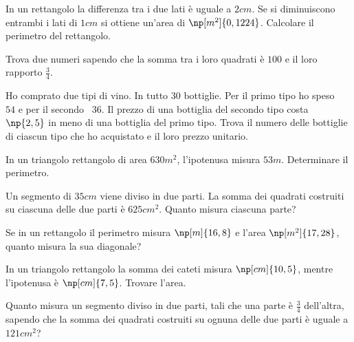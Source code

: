 \begin{multicols}{2}
\begin{esercizio}[\Ast]
 \label{ese:6.56}
In un rettangolo la differenza tra i due lati è uguale a $2\unit{cm}$. Se si diminuiscono entrambi i lati di $ 1\unit{cm} $ si ottiene un'area di $\np[m^2]{0,1224}$. Calcolare il perimetro del rettangolo.
\end{esercizio}

\begin{esercizio}[\Ast]
 \label{ese:6.57}
Trova due numeri sapendo che la somma tra i loro quadrati è $ 100 $ e il loro rapporto $ \frac 3 4 $.
\end{esercizio}

\begin{esercizio}[\Ast]
 \label{ese:6.58}
Ho comprato due tipi di vino. In tutto 30 bottiglie. Per il primo tipo ho speso \officialeuro~$54$ e per il secondo \officialeuro~$36$. Il prezzo di una bottiglia del secondo tipo costa \officialeuro~$\np{2,5}$ in meno di una bottiglia del primo tipo. Trova il numero delle bottiglie di ciascun tipo che ho acquistato e il loro prezzo unitario.
\end{esercizio}

\begin{esercizio}[\Ast]
 \label{ese:6.59}
In un triangolo rettangolo di area $630\unit{m^2}$, l'ipotenusa misura $53\unit{m}$. Determinare il perimetro.
\end{esercizio}

\begin{esercizio}[\Ast]
 \label{ese:6.60}
Un segmento di $35\unit{cm}$ viene diviso in due parti. La somma dei quadrati costruiti su ciascuna delle due parti è $625\unit{{cm}^2}$. Quanto misura ciascuna parte?
\end{esercizio}

\begin{esercizio}[\Ast]
 \label{ese:6.61}
Se in un rettangolo il perimetro misura $\np[m]{16,8}$ e l'area $ \np[m^2]{17,28}$, quanto misura la sua diagonale?
\end{esercizio}

\begin{esercizio}[\Ast]
 \label{ese:6.62}
In un triangolo rettangolo la somma dei cateti misura $\np[cm]{10,5}$, mentre l'ipotenusa è $\np[cm]{7,5}$. Trovare l'area.
\end{esercizio}

\begin{esercizio}[\Ast]
 \label{ese:6.63}
Quanto misura un segmento diviso in due parti, tali che una parte è $ \frac 3 4 $ dell'altra, sapendo che la somma dei quadrati costruiti su ognuna delle due parti è uguale a $121\unit{{cm}^2}$?
\end{esercizio}


\end{multicols}
